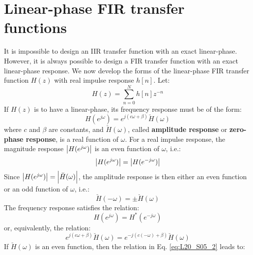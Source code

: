 \documentclass[../../main/main.tex]{subfiles}
\begin{document}

\section{Linear-phase FIR transfer functions}
It is impossible to design an IIR transfer function with an exact linear-phase. However, it is always possible to design a FIR transfer function with an exact linear-phase response. We now develop the forms of the linear-phase FIR transfer function \( H(z) \) with real impulse response \( h[n] \). Let:
\begin{equation}
    H(z)
    =
    \sum_{n=0}^{N} h[n] z^{-n}
    \label{eq:L20_S03_1}
\end{equation}
If \( H(z) \) is to have a linear-phase, its frequency response must be of the form:
\begin{equation}
    H(e^{j\omega})
    =
    e^{j(c\omega + \beta)} \breve{H}(\omega)
    \label{eq:L20_S03_2}
\end{equation}
%
where \( c \) and \( \beta \) are constants, and \( \breve{H}(\omega) \), called \textbf{amplitude response} or \textbf{zero-phase response}, is a real function of \( \omega \).
For a real impulse response, the magnitude response \( \abs{H(e^{j\omega})} \) is an even function of \( \omega \), i.e.:
\begin{equation}
    \abs{H(e^{j\omega})}
    =
    \abs{H(e^{-j\omega})}
    \label{eq:L20_S04_1}
\end{equation}
Since \( \abs{H(e^{j\omega})} = \abs{\breve{H}(\omega)} \), the amplitude response is then either an even function or an odd function of \( \omega \), i.e.:
\begin{equation}
    \breve{H}(-\omega)
    =
    \pm \breve{H}(\omega)
    \label{eq:L20_S04_2}
\end{equation}
The frequency response satisfies the relation:
\begin{equation}
    H(e^{j\omega})
    =
    H^{*}(e^{-j\omega})
    \label{eq:L20_S05_1}
\end{equation}
or, equivalently, the relation:
\begin{equation}
    e^{j(c\omega + \beta)} \breve{H}(\omega)
    =
    e^{-j(c(-\omega) + \beta)} \breve{H}(\omega)
    \label{eq:L20_S05_2}
\end{equation}
If \( \breve{H}(\omega) \) is an even function, then the relation in Eq. \ref{eq:L20_S05_2} leads to:
\end{document}
